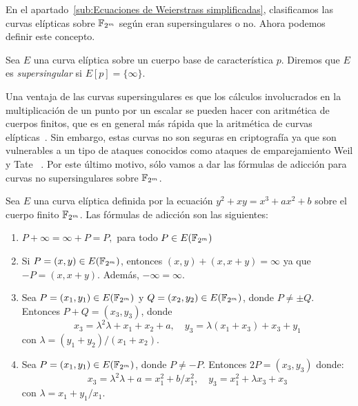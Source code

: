 En el apartado~\ref{sub:Ecuaciones de Weierstrass simplificadas}, clasificamos las curvas elípticas sobre $\mathbb{F}_{2^m}$ según eran supersingulares o no. Ahora podemos definir este concepto.

\begin{definicion}\label{def:supersingular}
	Sea $E$ una curva elíptica sobre un cuerpo base de característica $p$. Diremos que $E$ es \emph{supersingular} si $E[p] = \{\infty\}$.
\end{definicion}

Una ventaja de las curvas supersingulares es que los cálculos involucrados en la multiplicación de un punto por un escalar se pueden hacer con aritmética de cuerpos finitos, que es en general más rápida que la aritmética de curvas elípticas~\cite[cap. 4]{Washington:2008}. Sin embargo, estas curvas no son seguras en criptografía ya que son vulnerables a un tipo de ataques conocidos como ataques de emparejamiento Weil y Tate ~\cite[cap. 4]{Hankerson:2003}. Por este último motivo, sólo vamos a dar las fórmulas de adicción para curvas no supersingulares sobre $\mathbb{F}_{2^m}$.


\begin{formulasadiccion}\label{fa:cuerpos base caracteristica 2}
Sea $E$ una curva elíptica definida por la ecuación $y^2 + x y = x^3 + a x^2 + b$ sobre el cuerpo finito $\mathbb{F}_{2^m}$. Las fórmulas de adicción son las siguientes:
	\begin{enumerate}[label=\alph*)]
	   \item $P + \infty = \infty + P = P,$ para todo $P \in E(\mathbb{F}_{2^m})$
	   \item Si $P = (x, y) \in E(\mathbb{F}_{2^m})$, entonces $(x, y) + (x, x + y) = \infty$ ya que $-P = (x, x + y)$. Además, $- \infty = \infty$.
	   \item Sea $P = (x_1, y_1) \in E(\mathbb{F}_{2^m})$ y $Q = (x_2, y_2) \in E(\mathbb{F}_{2^m})$, donde $P \neq \pm Q$. Entonces $P + Q = (x_3, y_3)$, donde
	   $$
	   x_3 = \lambda^2 \lambda + x_1 + x_2 + a, \quad
	   y_3 = \lambda (x_1 + x_3) + x_3 + y_1
	   $$
	   con $\lambda = (y_1 + y_2)/(x_1 + x_2)$.
	   \item Sea $P = (x_1, y_1) \in E(\mathbb{F}_{2^m})$, donde $P \neq -P$. Entonces $2 P = (x_3, y_3)$ donde:
	   $$
	   x_3 = \lambda^2 \lambda + a = x_1^2 + b/x_1^2, \quad
	   y_3 = x_1^2 + \lambda x_3 + x_3
	   $$
	   con $\lambda = x_1 + y_1/x_1$.
	\end{enumerate}
\end{formulasadiccion}

